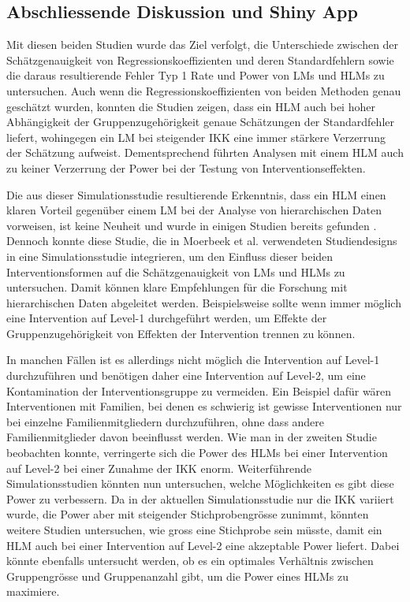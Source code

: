 \documentclass[12pt]{article}\usepackage[]{graphicx}\usepackage[]{color}
\begin{document}
\subsection{Abschliessende Diskussion und Shiny App}
Mit diesen beiden Studien wurde das Ziel verfolgt, die Unterschiede zwischen der Schätzgenauigkeit von Regressionskoeffizienten und deren Standardfehlern sowie die daraus resultierende Fehler Typ 1 Rate und Power von LMs und HLMs zu untersuchen. Auch wenn die Regressionskoeffizienten von beiden Methoden genau geschätzt wurden, konnten die Studien zeigen, dass ein HLM auch bei hoher Abhängigkeit der Gruppenzugehörigkeit genaue Schätzungen der Standardfehler liefert, wohingegen ein LM bei steigender IKK eine immer stärkere Verzerrung der Schätzung aufweist. Dementsprechend führten Analysen mit einem HLM auch zu keiner Verzerrung der Power bei der Testung von Interventionseffekten.

Die aus dieser Simulationsstudie resultierende Erkenntnis, dass ein HLM einen klaren Vorteil gegenüber einem LM bei der Analyse von hierarchischen Daten vorweisen, ist keine Neuheit und wurde in einigen Studien bereits gefunden \citep{mcneish2014analyzing, MOERBEEK2003341, mundfrom2002monte, osborne2000advantages}. Dennoch konnte diese Studie, die in Moerbeek et al. \citeyearpar{MOERBEEK2003341} verwendeten Studiendesigns in eine Simulationsstudie integrieren, um den Einfluss dieser beiden Interventionsformen auf die Schätzgenauigkeit von LMs und HLMs zu untersuchen. Damit können klare Empfehlungen für die Forschung mit hierarchischen Daten abgeleitet werden. Beispielsweise sollte wenn immer möglich eine Intervention auf Level-1 durchgeführt werden, um Effekte der Gruppenzugehörigkeit von Effekten der Intervention trennen zu können. 

In manchen Fällen ist es allerdings nicht möglich die Intervention auf Level-1 durchzuführen und benötigen daher eine Intervention auf Level-2, um eine Kontamination der Interventionsgruppe zu vermeiden. Ein Beispiel dafür wären Interventionen mit Familien, bei denen es schwierig ist gewisse Interventionen nur bei einzelne Familienmitgliedern durchzuführen, ohne dass andere Familienmitglieder davon beeinflusst werden. Wie man in der zweiten Studie beobachten konnte, verringerte sich die Power des HLMs bei einer Intervention auf Level-2 bei einer Zunahme der IKK enorm. Weiterführende Simulationsstudien könnten nun untersuchen, welche Möglichkeiten es gibt diese Power zu verbessern. Da in der aktuellen Simulationsstudie nur die IKK variiert wurde, die Power aber mit steigender Stichprobengrösse zunimmt, könnten weitere Studien untersuchen, wie gross eine Stichprobe sein müsste, damit ein HLM auch bei einer Intervention auf Level-2 eine akzeptable Power liefert. Dabei könnte ebenfalls untersucht werden, ob es ein optimales Verhältnis zwischen Gruppengrösse und Gruppenanzahl gibt, um die Power eines HLMs zu maximiere.
\end{document}
